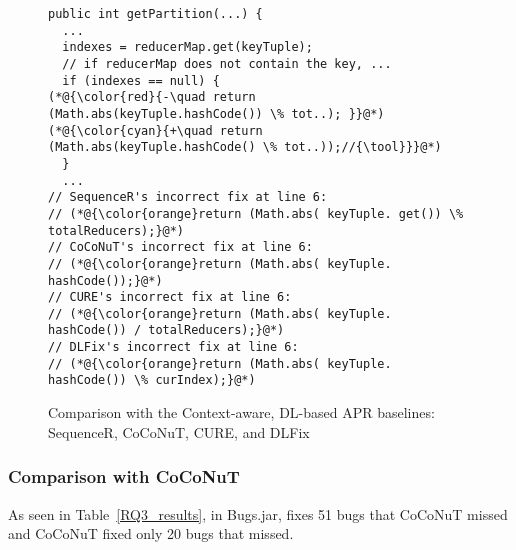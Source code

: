 
\begin{figure}[t]
	\centering
	\begin{lstlisting}[]
public int getPartition(...) {
  ...
  indexes = reducerMap.get(keyTuple);
  // if reducerMap does not contain the key, ...
  if (indexes == null) {
(*@{\color{red}{-\quad return (Math.abs(keyTuple.hashCode()) \% tot..);	}}@*)
(*@{\color{cyan}{+\quad return (Math.abs(keyTuple.hashCode() \% tot..));//{\tool}}}@*)
  }
  ...
// SequenceR's incorrect fix at line 6:
// (*@{\color{orange}return (Math.abs( keyTuple. get()) \% totalReducers);}@*)
// CoCoNuT's incorrect fix at line 6:
// (*@{\color{orange}return (Math.abs( keyTuple. hashCode());}@*)
// CURE's incorrect fix at line 6:
// (*@{\color{orange}return (Math.abs( keyTuple. hashCode()) / totalReducers);}@*)
// DLFix's incorrect fix at line 6:
// (*@{\color{orange}return (Math.abs( keyTuple. hashCode()) \% curIndex);}@*)
	\end{lstlisting}
        \vspace{-15pt}
	\caption{Comparison with the Context-aware, DL-based APR baselines: SequenceR, CoCoNuT, CURE, and DLFix}
	\label{example_3}
\end{figure}



\subsubsection{\bf Comparison with CoCoNuT}

As seen in Table~\ref{RQ3_results}, in Bugs\-.jar, {\tool} fixes 51
bugs that CoCoNuT missed and CoCoNuT fixed only 20 bugs that {\tool}
missed.

